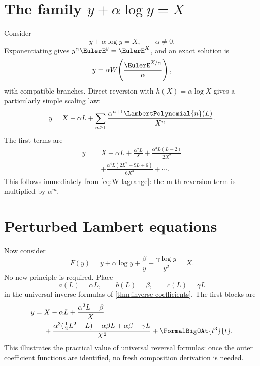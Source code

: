 \documentclass[11pt,openany]{book}
\theoremstyle{definition}
\theoremstyle{plain}
\theoremstyle{remark}
\begin{document}
\section{The family \texorpdfstring{\(y+\alpha\log y=X\)}{y + alpha log y = X}}
Consider
\begin{equation}\label{eq:alpha-log-inversion}
 y+\alpha\log y=X,
 \qquad \alpha\ne0.
\end{equation}
Exponentiating gives \(y^\alpha\EulerE^y=\EulerE^X\), and an exact solution is
\begin{equation}\label{eq:alpha-exact-W}
 y=\alpha W\!\left(\frac{\EulerE^{X/\alpha}}{\alpha}\right),
\end{equation}
with compatible branches.  Direct reversion with \(h(X)=\alpha\log X\) gives a
particularly simple scaling law:
\begin{equation}\label{eq:alpha-expansion}
 y=X-\alpha L+
 \sum_{n\ge1}\frac{\alpha^{n+1}\LambertPolynomial{n}(L)}{X^n}.
\end{equation}
The first terms are
\begin{equation}\label{eq:alpha-first-terms}
\begin{split}
 y={}&X-\alpha L+\frac{\alpha^2L}{X}
 +\frac{\alpha^3L(L-2)}{2X^2}\\
 &+\frac{\alpha^4L(2L^2-9L+6)}{6X^3}+\cdots.
\end{split}
\end{equation}
This follows immediately from \cref{eq:W-lagrange}: the m-th reversion term is
multiplied by \(\alpha^m\).

\section{Perturbed Lambert equations}
Now consider
\begin{equation}\label{eq:perturbed-Lambert}
 F(y)=y+\alpha\log y+\frac{\beta}{y}+\frac{\gamma\log y}{y^2}=X.
\end{equation}
No new principle is required.  Place
\[
 a(L)=\alpha L,
 \qquad b(L)=\beta,
 \qquad c(L)=\gamma L
\]
in the universal inverse formulas of \cref{thm:inverse-coefficients}.  The
first blocks are
\begin{equation}\label{eq:perturbed-Lambert-inverse}
\begin{split}
 y={}&X-\alpha L+\frac{\alpha^2L-\beta}{X}\\
 &+\frac{\alpha^3(\tfrac12L^2-L)-\alpha\beta L+\alpha\beta-\gamma L}{X^2}
 +\FormalBigOAt{t^3}{t}.
\end{split}
\end{equation}
This illustrates the practical value of universal reversal formulas: once the
outer coefficient functions are identified, no fresh composition derivation is
needed.
\end{document}
